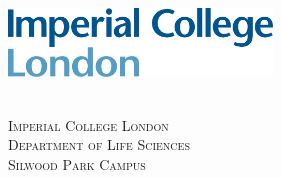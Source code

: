 
\begin{titlepage} %
    
    \includegraphics[width=7cm]{Figures/collegeLogo.png} %
     
    
    \center %
    

    \quad\\[1cm]
    \textsc{\Large Imperial College London}\\[0.5cm] %
    \textsc{\Large Department of Life Sciences}\\[0.5cm]
    \textsc{\Large Silwood Park Campus}\\[1cm] %
     
    \makeatletter
    \HRule \\[0.4cm]
    { \huge \bfseries \@title}\\[0.4cm] %
    \HRule \\[1cm]
     

\end{titlepage}
